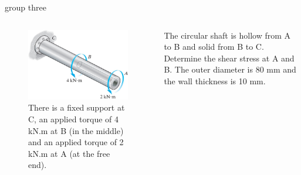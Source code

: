 \documentclass[
  letterpaper,
  ignorenonframetext,
  aspectratio=43,
  handout,
  12pt]{beamer}
\let\Oldincludegraphics\includegraphics
\renewcommand{\includegraphics}[2][]{\Oldincludegraphics[width=\textwidth,height=0.7\textheight,keepaspectratio]{#2}}
\begin{document}
\begin{frame}{group three}
\protect\hypertarget{group-three}{}
\begin{columns}[T]
\begin{column}{0.5\textwidth}
\begin{figure}
\centering
\includegraphics{../images/group5-3.jpg}
\caption{There is a fixed support at C, an applied torque of 4 kN.m at B
(in the middle) and an applied torque of 2 kN.m at A (at the free end).}
\end{figure}
\end{column}

\begin{column}{0.5\textwidth}
The circular shaft is hollow from A to B and solid from B to C.
Determine the shear stress at A and B. The outer diameter is 80 mm and
the wall thickness is 10 mm.
\end{column}
\end{columns}
\end{frame}
\end{document}
